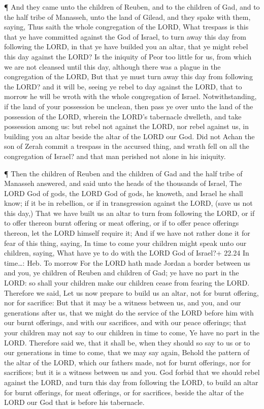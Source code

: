  ¶ And they came unto the children of Reuben, and to the
children of Gad, and to the half tribe of Manasseh, unto the land of
Gilead, and they spake with them, saying,  Thus saith the
whole congregation of the LORD, What trespass is this that ye have
committed against the God of Israel, to turn away this day from
following the LORD, in that ye have builded you an altar, that ye might
rebel this day against the LORD?  Is the iniquity of Peor
too little for us, from which we are not cleansed until this day,
although there was a plague in the congregation of the LORD,
 But that ye must turn away this day from following the
LORD? and it will be, seeing ye rebel to day against the LORD, that to
morrow he will be wroth with the whole congregation of Israel.
 Notwithstanding, if the land of your possession be
unclean, then pass ye over unto the land of the possession of the LORD,
wherein the LORD's tabernacle dwelleth, and take possession among us:
but rebel not against the LORD, nor rebel against us, in building you an
altar beside the altar of the LORD our God.  Did not Achan
the son of Zerah commit a trespass in the accursed thing, and wrath fell
on all the congregation of Israel? and that man perished not alone in
his iniquity.

 ¶ Then the children of Reuben and the children of Gad and
the half tribe of Manasseh answered, and said unto the heads of the
thousands of Israel,  The LORD God of gods, the LORD God of
gods, he knoweth, and Israel he shall know; if it be in rebellion, or if
in transgression against the LORD, (save us not this day,) 
That we have built us an altar to turn from following the LORD, or if to
offer thereon burnt offering or meat offering, or if to offer peace
offerings thereon, let the LORD himself require it;  And if
we have not rather done it for fear of this thing, saying, In time to
come your children might speak unto our children, saying, What have ye
to do with the LORD God of Israel?+ 22.24 In time\ldots: Heb. To morrow
 For the LORD hath made Jordan a border between us and you,
ye children of Reuben and children of Gad; ye have no part in the LORD:
so shall your children make our children cease from fearing the LORD.
 Therefore we said, Let us now prepare to build us an
altar, not for burnt offering, nor for sacrifice:  But that
it may be a witness between us, and you, and our generations after us,
that we might do the service of the LORD before him with our burnt
offerings, and with our sacrifices, and with our peace offerings; that
your children may not say to our children in time to come, Ye have no
part in the LORD.  Therefore said we, that it shall be,
when they should so say to us or to our generations in time to come,
that we may say again, Behold the pattern of the altar of the LORD,
which our fathers made, not for burnt offerings, nor for sacrifices; but
it is a witness between us and you.  God forbid that we
should rebel against the LORD, and turn this day from following the
LORD, to build an altar for burnt offerings, for meat offerings, or for
sacrifices, beside the altar of the LORD our God that is before his
tabernacle.

